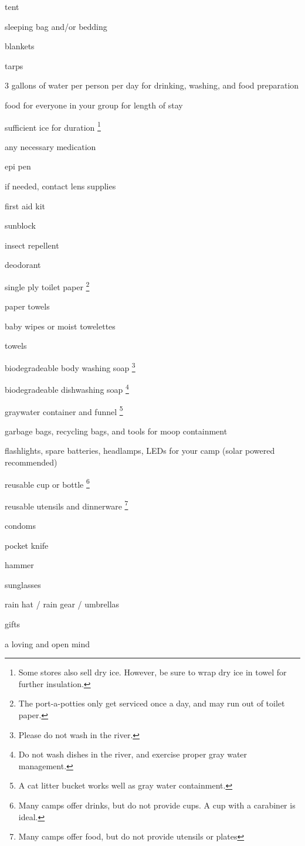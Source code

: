 \begin{multicols}{2}

\begin{checklist}
	\item tent
    \item sleeping bag and/or bedding
    \item blankets
    \item tarps
    \item 3 gallons of water per person per day for drinking, washing, and food preparation
    \item food for everyone in your group for length of stay
    \item sufficient ice for duration \footnote{Some stores also sell dry ice. However, be sure to wrap dry ice in towel for further insulation.}
    \item any necessary medication
    \item epi pen
    \item if needed, contact lens supplies
    \item first aid kit
    \item sunblock
    \item insect repellent
    \item deodorant
    \item single ply toilet paper \footnote{The port-a-potties only get serviced once a day, and may run out of toilet paper.}
    \item paper towels
    \item baby wipes or moist towelettes
    \item towels
    \item biodegradeable body washing soap \footnote{Please do not wash in the river.}
    \item biodegradeable dishwashing soap \footnote{Do not wash dishes in the river, and exercise proper gray water management.}
    \item \gls{graywater} container and funnel \footnote{A cat litter bucket works well as gray water containment.}
    \item garbage bags, recycling bags, and tools for \gls{moop} containment
    \item flashlights, spare batteries, headlamps, LEDs for your camp  (solar powered recommended) 
    \item reusable cup or bottle \footnote{Many camps offer drinks, but do not provide cups.  A cup with a carabiner is ideal.}
    \item reusable utensils and dinnerware \footnote{Many camps offer food, but do not provide utensils or plates}
    \item condoms
    \item pocket knife
    \item hammer
    \item sunglasses
    \item rain hat / rain gear / umbrellas
    \item gifts
    \item a loving and open mind
    \item \hrulefill
\end{checklist}


\end{multicols}
